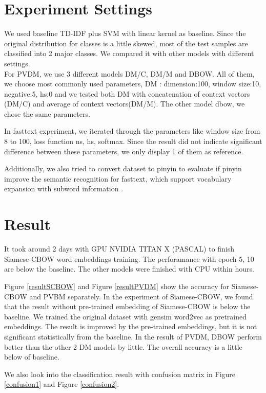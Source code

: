 \section{Experiment Settings}


We used baseline TD-IDF plus SVM with linear kernel as baseline. 
Since the original distribution for classes is a little skewed, most of the test samples are classified into 2 major classes.
We compared it with other models with different settings. \\

For PVDM, we use 3 different models DM/C, DM/M and DBOW. All of them, we choose most commonly used parameters, DM : dimension:100, window size:10, negative:5, hs:0 and we tested both DM with concatenation of context vectors (DM/C) and average of context vectors(DM/M). 
The other model dbow, we chose the same parameters.

In fasttext experiment, we iterated through the parameters like window size from 8 to 100, 
loss function ns, hs, softmax.  Since the result did not indicate significant difference between these parameters, 
we only display 1 of them as reference.

Additionally, we also tried to convert dataset to pinyin to evaluate if pinyin improve the semantic recognition for fasttext, 
which support vocabulary expansion with subword information \cite{bojanowski2016enriching}. 

\section{Result}

It took around 2 days with GPU NVIDIA TITAN X (PASCAL) to finish Siamese-CBOW word embeddings training. The perforamance with epoch 5, 10 are below the baseline. 
The other models were finished with CPU within hours.

Figure \ref{resultSCBOW} and Figure \ref{resultPVDM} show the accuracy for Siamese-CBOW and PVBM separately. 
In the experiment of Siamese-CBOW, we found that the result without pre-trained embedding of Siamese-CBOW is below the baseline. We trained the original dataset with gensim word2vec as pretrained embeddings.
The result is improved by the pre-trained embeddings, but it is not significant statistically from the baseline. In the result of PVDM, DBOW perform better than the other 2 DM models by little. 
The overall accuracy is a little below of baseline.

We also look into the classification result with confusion matrix in Figure \ref{confusion1} and Figure \ref{confusion2}.


